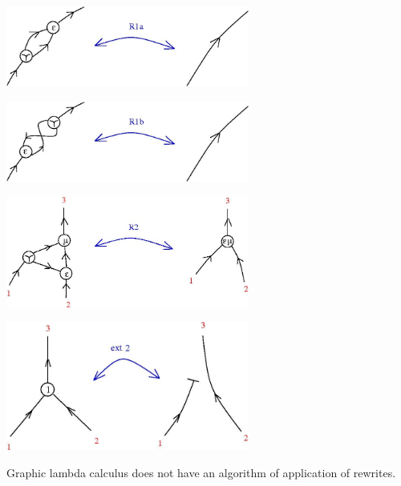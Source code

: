 \documentclass{article}
\begin{document}
\vspace{.5cm}

\centerline{\includegraphics[width=0.6\textwidth]{../img/glc/r1amove.jpg}
}
\vspace{.5cm}

\vspace{.5cm}
 
\centerline{\includegraphics[width=0.6\textwidth]{../img/glc/r1bmove.jpg}
}
\vspace{.5cm}

\centerline{\includegraphics[width=0.6\textwidth]{../img/glc/r2move.jpg}
}
\vspace{.5cm}


\vspace{.5cm}
 
\centerline{\includegraphics[width=0.6\textwidth]{../img/glc/ext2r.jpg}
}
\vspace{.5cm}
Graphic lambda calculus does not have an algorithm of application of rewrites. 
\end{document}
